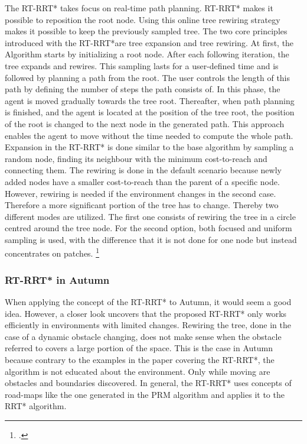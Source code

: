 The RT-RRT* takes focus on real-time path planning. RT-RRT* makes it possible to reposition the root node. Using this online tree rewiring strategy makes it possible to keep the previously sampled tree.
The two core principles introduced with the RT-RRT*are tree expansion and tree rewiring. 
At first, the Algorithm starts by initializing a root node. After each following iteration, the tree expands and rewires. This sampling lasts for a user-defined time and is followed by planning a path from the root. The user controls the length of this path by defining the number of steps the path consists of. In this phase, the agent is moved gradually towards the tree root. Thereafter, when path planning is finished, and the agent is located at the position of the tree root, the position of the root is changed to the next node in the generated path. This approach enables the agent to move without the time needed to compute the whole path.
Expansion in the RT-RRT* is done similar to the base algorithm by sampling a random node, finding its neighbour with the minimum cost-to-reach and connecting them.
The rewiring is done in the default scenario because newly added nodes have a smaller cost-to-reach than the parent of a specific node. However, rewiring is needed if the environment changes in the second case. Therefore a more significant portion of the tree has to change. Thereby two different modes are utilized. The first one consists of rewiring the tree in a circle centred around the tree node. For the second option, both focused and uniform sampling is used, with the difference that it is not done for one node but instead concentrates on patches.
\footcite{Naderi2015}

\subsubsection{RT-RRT* in Autumn}

When applying the concept of the RT-RRT* to Autumn, it would seem a good idea. However, a closer look uncovers that the proposed RT-RRT* only works efficiently in environments with limited changes. Rewiring the tree, done in the case of a dynamic obstacle changing, does not make sense when the obstacle referred to covers a large portion of the space. This is the case in Autumn because contrary to the examples in the paper covering the RT-RRT*, the algorithm is not educated about the environment. Only while moving are obstacles and boundaries discovered. In general, the RT-RRT* uses concepts of road-maps like the one generated in the PRM algorithm and applies it to the RRT* algorithm.  

